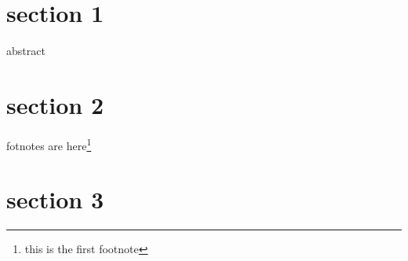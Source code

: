 
\section{section 1}
abstract\cite{wikipedia_2022}

\section{section 2}

fotnotes are here\footnote{this is the first footnote}

\section{section 3}